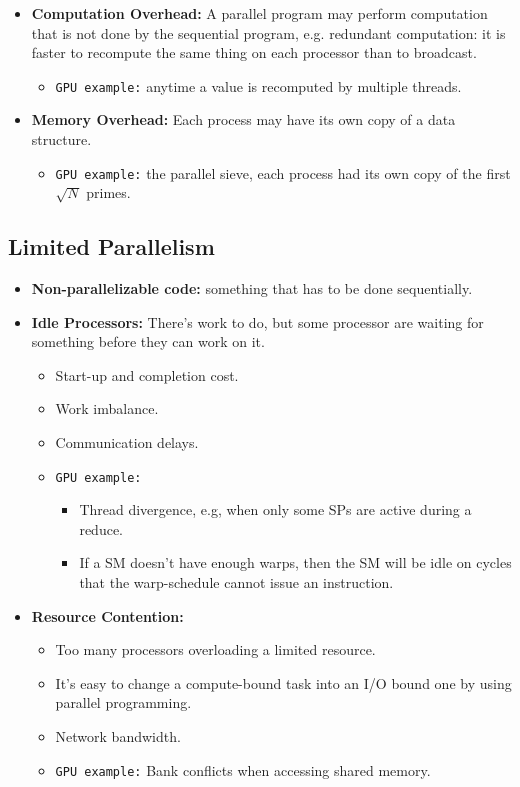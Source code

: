 \documentclass[../main.tex]{subfiles}
\begin{document}
\begin{itemize}
\begin{itemize}
{		            }
	      \end{itemize}
	\item \textbf{Computation Overhead:} A parallel program may perform computation that is not done by the sequential program, e.g. redundant computation: it is faster to recompute the same thing on each processor than to broadcast.
	      \begin{itemize}
		      \item \texttt{GPU example:} anytime a value is recomputed by multiple threads.
	      \end{itemize}
	\item \textbf{Memory Overhead:} Each process may have its own copy of a data structure.
	      \begin{itemize}
		      \item \texttt{GPU example:} the parallel sieve, each process had its own copy of the first \(\sqrt{N}\) primes.
	      \end{itemize}
\end{itemize}

\subsection{Limited Parallelism}

\begin{itemize}
	\item \textbf{Non-parallelizable code:} something that has to be done sequentially.
	\item \textbf{Idle Processors:} There's work to do, but some processor are waiting for something before they can work on it.
	      \begin{itemize}
		      \item Start-up and completion cost.
		      \item Work imbalance.
		      \item Communication delays.
		      \item {
		            \texttt{GPU example:}
		            \begin{itemize}
			            \item Thread divergence, e.g, when only some SPs are active during a reduce.
			            \item If a SM doesn't have enough warps, then the SM will be idle on cycles that the warp-schedule cannot issue an instruction.
		            \end{itemize}
		            }
	      \end{itemize}
	\item \textbf{Resource Contention:}
	      \begin{itemize}
		      \item Too many processors overloading a limited resource.
		      \item It's easy to change a compute-bound task into an I/O bound one by using parallel programming.
		      \item Network bandwidth.
		      \item \texttt{GPU example:} Bank conflicts when accessing shared memory.
	      \end{itemize}
\end{itemize}
\end{document}
